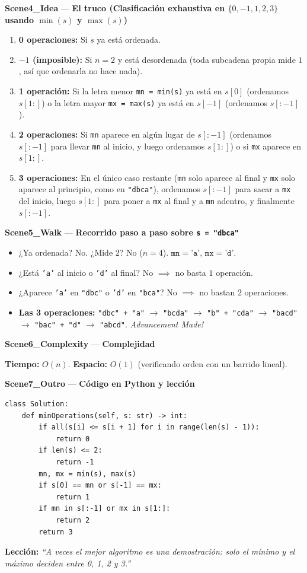 \documentclass[letterpaper,10pt]{article}
\newcommand{\scene}[2]{\noindent\textbf{\textcolor{mcaqua}{#1}} --- \textbf{#2}\par\vspace{1pt}}
\begin{document}
\begin{shaded}
\scene{Scene4\_Idea}{El truco (Clasificaci\'on exhaustiva en $\{0, -1, 1, 2, 3\}$ usando $\min(s)$ y $\max(s)$)}
\begin{enumerate}\setlength{\itemsep}{1pt}
  \item \textbf{0 operaciones:} Si $s$ ya est\'a ordenada.
  \item \textbf{$-1$ (imposible):} Si $n = 2$ y est\'a desordenada (toda subcadena propia mide $1$, as\'i que ordenarla no hace nada).
  \item \textbf{1 operaci\'on:} Si la letra menor \texttt{mn = min(s)} ya est\'a en $s[0]$ (ordenamos $s[1:]$) o la letra mayor \texttt{mx = max(s)} ya est\'a en $s[-1]$ (ordenamos $s[:-1]$).
  \item \textbf{2 operaciones:} Si \texttt{mn} aparece en alg\'un lugar de $s[:-1]$ (ordenamos $s[:-1]$ para llevar \texttt{mn} al inicio, y luego ordenamos $s[1:]$) o si \texttt{mx} aparece en $s[1:]$.
  \item \textbf{3 operaciones:} En el \'unico caso restante (\texttt{mn} solo aparece al final y \texttt{mx} solo aparece al principio, como en \texttt{"dbca"}), ordenamos $s[:-1]$ para sacar a \texttt{mx} del inicio, luego $s[1:]$ para poner a \texttt{mx} al final y a \texttt{mn} adentro, y finalmente $s[:-1]$.
\end{enumerate}

\scene{Scene5\_Walk}{Recorrido paso a paso sobre \texttt{s = "dbca"}}
\begin{itemize}\setlength{\itemsep}{1pt}
  \item ¿Ya ordenada? No. ¿Mide $2$? No ($n = 4$). $\texttt{mn} = \texttt{'a'},\, \texttt{mx} = \texttt{'d'}$.
  \item ¿Est\'a \texttt{'a'} al inicio o \texttt{'d'} al final? No $\implies$ no basta $1$ operaci\'on.
  \item ¿Aparece \texttt{'a'} en \texttt{"dbc"} o \texttt{'d'} en \texttt{"bca"}? No $\implies$ no bastan $2$ operaciones.
  \item \textbf{Las 3 operaciones:} \texttt{"dbc" + "a"} $\to$ \texttt{"bcda"} $\to$ \texttt{"b" + "cda"} $\to$ \texttt{"bacd"} $\to$ \texttt{"bac" + "d"} $\to$ \texttt{"abcd"}. \textit{Advancement Made!}
\end{itemize}

\scene{Scene6\_Complexity}{Complejidad}
\textbf{Tiempo:} $O(n)$. \quad \textbf{Espacio:} $O(1)$ (verificando orden con un barrido lineal).
\end{shaded}

\scene{Scene7\_Outro}{C\'odigo en Python y lecci\'on}
\begin{Verbatim}[frame=single,fontsize=\small]
class Solution:
    def minOperations(self, s: str) -> int:
        if all(s[i] <= s[i + 1] for i in range(len(s) - 1)):
            return 0
        if len(s) <= 2:
            return -1
        mn, mx = min(s), max(s)
        if s[0] == mn or s[-1] == mx:
            return 1
        if mn in s[:-1] or mx in s[1:]:
            return 2
        return 3
\end{Verbatim}
\textbf{Lecci\'on:} \textit{``A veces el mejor algoritmo es una demostraci\'on: solo el m\'inimo y el m\'aximo deciden entre 0, 1, 2 y 3.''}
\end{document}
